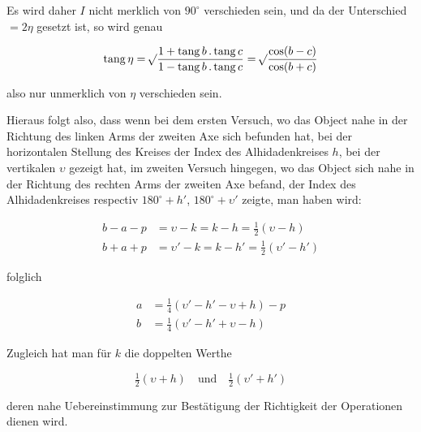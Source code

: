 \noindent Es wird daher $I$ nicht merklich von $90^\circ$ verschieden sein, und da der Unterschied $=2\eta$ gesetzt ist, so wird genau

\[ \mathrm{tang}\,\eta = \mathord{{}^{}\!\surd}\dfrac{1+\mathrm{tang}\,b\,.\,\mathrm{tang}\,c}{1-\mathrm{tang}\,b\,.\,\mathrm{tang}\,c} = \mathord{{}^{}\!\surd}\dfrac{\cos(b-c)}{\cos(b+c)} \]

\noindent also nur unmerklich von $\eta$ verschieden sein.

\par\indent Hieraus folgt also, dass wenn bei dem ersten Versuch, wo das Object nahe in der Richtung des linken Arms der zweiten Axe sich befunden hat, bei der horizontalen Stellung des Kreises der Index des Alhidadenkreises $h$, bei der vertikalen $\upsilon$ gezeigt hat, im zweiten Versuch hingegen, wo das Object sich nahe in der Richtung des rechten Arms der zweiten Axe befand, der Index des Alhidadenkreises respectiv $180^\circ+h'$, $180^\circ+\upsilon'$ zeigte, man haben wird:

\[ \begin{aligned} b-a-p &= \upsilon-k = k-h = \tfrac{1}{2}(\upsilon-h) \\ b+a+p &= \upsilon'-k = k-h' = \tfrac{1}{2}(\upsilon'-h') \end{aligned} \]

\noindent folglich

\[ \begin{aligned} a &= \tfrac{1}{4}(\upsilon'-h'-\upsilon+h)-p \\ b &= \tfrac{1}{4}(\upsilon'-h'+\upsilon-h) \end{aligned} \]

\noindent Zugleich hat man für $k$ die doppelten Werthe

\[ \tfrac{1}{2}(\upsilon+h) \quad\text{und}\quad \tfrac{1}{2}(\upsilon'+h') \]

\noindent deren nahe Uebereinstimmung zur Bestätigung der Richtigkeit der Operationen dienen wird.

